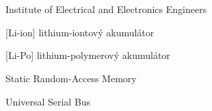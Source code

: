 \cleardoublepage
\chapter*{\listofabbrevname}
{}

\begin{acronym}[Li-ion]

        {Institute of Electrical and Electronics Engineers}

        [Li-ion]
        {lithium-iontový akumulátor}

        [Li-Po]
        {lithium-polymerový akumulátor}

        {Static Random-Access Memory}

        {Universal Serial Bus}

\end{acronym}